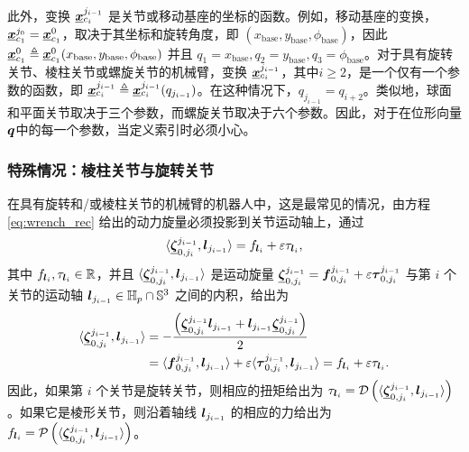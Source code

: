 此外，变换 $\underline{\boldsymbol{x}}_{c_{i}}^{j_{i-1}}$ 是关节或移动基座的坐标的函数。例如，移动基座的变换，$\underline{\boldsymbol{x}}_{c_{1}}^{j_{0}}=\underline{\boldsymbol{x}}_{c_{1}}^{0}$，取决于其坐标和旋转角度，即 $(x_{\mathrel{\mathrm{base}}},y_{\mathrel{\mathrm{base}}},\phi_{\mathrel{\mathrm{base}}})$，因此 $\underline{\boldsymbol{x}}_{c_{1}}^{0}\triangleq\underline{\boldsymbol{x}}_{c_{1}}^{0}(x_{\mathrel{\mathrm{base}}},y_{\mathrel{\mathrm{base}}},\phi_{\mathrel{\mathrm{base}}})$ 并且 $q_{1}=x_{\mathrel{\mathrm{base}}},q_{2}=y_{\mathrm{\mathrel{base}}},q_{3}=\phi_{\mathrm{\mathrel{base}}}$。对于具有旋转关节、棱柱关节或螺旋关节的机械臂，变换 $\underline{\boldsymbol{x}}_{c_{i}}^{j_{i-1}}$，其中$i\geq2$，是一个仅有一个参数的函数，即 $\underline{\boldsymbol{x}}_{c_{i}}^{j_{i-1}}\triangleq\underline{\boldsymbol{x}}_{c_{i}}^{j_{i-1}}(q_{j_{i-1}})$。在这种情况下，$q_{j_{i-1}}=q_{i+2}$。类似地，球面和平面关节取决于三个参数，而螺旋关节取决于六个参数。因此，对于在位形向量 $\boldsymbol{q}$中的每一个参数，当定义索引时必须小心。

\subsubsection{\normalfont\bfseries 特殊情况：棱柱关节与旋转关节}

在具有旋转和/或棱柱关节的机械臂的机器人中，这是最常见的情况，由方程 \eqref{eq:wrench_rec} 给出的动力旋量必须投影到关节运动轴上，通过
\begin{equation}
\langle\underline{\boldsymbol{\zeta}}_{0,j_{i}}^{j_{i-1}},\boldsymbol{l}_{j_{i-1}}\rangle=f_{\boldsymbol{l}_{i}}+\varepsilon\tau_{\boldsymbol{l}_{i}},\label{eq:wrench_projection_to_motion_axis}
\end{equation}
其中 $f_{\boldsymbol{l}_{i}},\tau_{\boldsymbol{l}_{i}}\in\mathbb{R}$，并且 $\langle\underline{\boldsymbol{\zeta}}_{0,j_{i}}^{j_{i-1}},\boldsymbol{l}_{j_{i-1}}\rangle$
是运动旋量 $\underline{\boldsymbol{\zeta}}_{0,j_{i}}^{j_{i-1}}=\boldsymbol{f}_{0,j_{i}}^{j_{i-1}}+\varepsilon\boldsymbol{\tau}_{0,j_{i}}^{j_{i-1}}$ 与第 $i$ 个关节的运动轴 $\boldsymbol{l}_{j_{i-1}}\in\mathbb{H}_{p}\cap\mathbb{S}^{3}$ 之间的内积，给出为 \cite{Adorno2017}
\begin{align*}
\langle\underline{\boldsymbol{\zeta}}_{0,j_{i}}^{j_{i-1}},\boldsymbol{l}_{j_{i-1}}\rangle & =-\frac{\left(\underline{\boldsymbol{\zeta}}_{0,j_{i}}^{j_{i-1}}\boldsymbol{l}_{j_{i-1}}+\boldsymbol{l}_{j_{i-1}}\underline{\boldsymbol{\zeta}}_{0,j_{i}}^{j_{i-1}}\right)}{2}\\
 & =\langle\boldsymbol{f}_{0,j_{i}}^{j_{i-1}},\boldsymbol{l}_{j_{i-1}}\rangle+\varepsilon\langle\boldsymbol{\tau}_{0,j_{i}}^{j_{i-1}},\boldsymbol{l}_{j_{i-1}}\rangle=f_{\boldsymbol{l}_{i}}+\varepsilon\tau_{\boldsymbol{l}_{i}}.
\end{align*}
因此，如果第 $i$ 个关节是旋转关节，则相应的扭矩给出为 $\tau_{\boldsymbol{l}_{i}}=\operatorname{\mathcal{D}}\left(\langle\underline{\boldsymbol{\zeta}}_{0,j_{i}}^{j_{i-1}},\boldsymbol{l}_{j_{i-1}}\rangle\right)$。如果它是棱形关节，则沿着轴线 $\boldsymbol{l}_{j_{i-1}}$ 的相应的力给出为 $f_{\boldsymbol{l}_{i}}=\operatorname{\mathcal{P}}\left(\langle\underline{\boldsymbol{\zeta}}_{0,j_{i}}^{j_{i-1}},\boldsymbol{l}_{j_{i-1}}\rangle\right)$。

